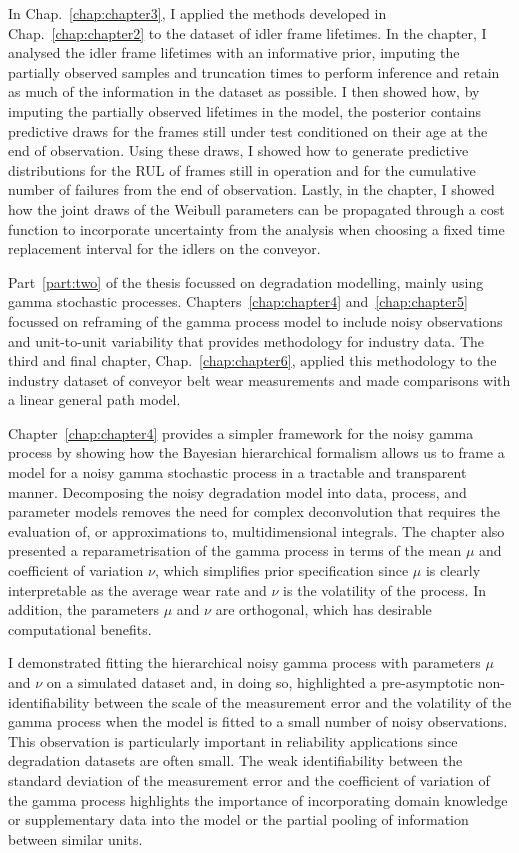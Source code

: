 In Chap.~\ref{chap:chapter3}, I applied the methods developed in Chap.~\ref{chap:chapter2} to the dataset of idler frame lifetimes. In the chapter, I analysed the idler frame lifetimes with an informative prior, imputing the partially observed samples and truncation times to perform inference and retain as much of the information in the dataset as possible. I then showed how, by imputing the partially observed lifetimes in the model, the posterior contains predictive draws for the frames still under test conditioned on their age at the end of observation. Using these draws, I showed how to generate predictive distributions for the RUL of frames still in operation and for the cumulative number of failures from the end of observation. Lastly, in the chapter, I showed how the joint draws of the Weibull parameters can be propagated through a cost function to incorporate uncertainty from the analysis when choosing a fixed time replacement interval for the idlers on the conveyor. 

Part~\ref{part:two} of the thesis focussed on degradation modelling, mainly using gamma stochastic processes. Chapters~\ref{chap:chapter4} and~\ref{chap:chapter5} focussed on reframing of the gamma process model to include noisy observations and unit-to-unit variability that provides methodology for industry data. The third and final chapter, Chap.~\ref{chap:chapter6}, applied this methodology to the industry dataset of conveyor belt wear measurements and made comparisons with a linear general path model.

Chapter~\ref{chap:chapter4} provides a simpler framework for the noisy gamma process by showing how the Bayesian hierarchical formalism allows us to frame a model for a noisy gamma stochastic process in a tractable and transparent manner. Decomposing the noisy degradation model into data, process, and parameter models removes the need for complex deconvolution that requires the evaluation of, or approximations to, multidimensional integrals. The chapter also presented a reparametrisation of the gamma process in terms of the mean $\mu$ and coefficient of variation $\nu$, which simplifies prior specification since $\mu$ is clearly interpretable as the average wear rate and $\nu$ is the volatility of the process. In addition, the parameters $\mu$ and $\nu$ are orthogonal, which has desirable computational benefits.

I demonstrated fitting the hierarchical noisy gamma process with parameters $\mu$ and $\nu$ on a simulated dataset and, in doing so, highlighted a pre-asymptotic non-identifiability between the scale of the measurement error and the volatility of the gamma process when the model is fitted to a small number of noisy observations. This observation is particularly important in reliability applications since degradation datasets are often small. The weak identifiability between the standard deviation of the measurement error and the coefficient of variation of the gamma process highlights the importance of incorporating domain knowledge or supplementary data into the model or the partial pooling of information between similar units.

